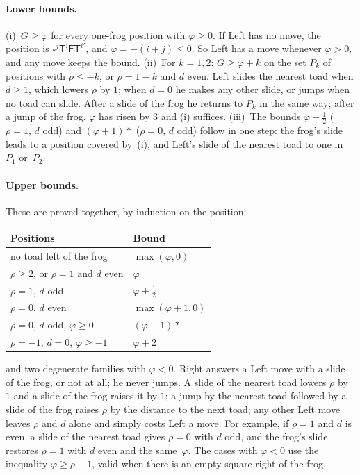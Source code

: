 \documentclass[11pt,a4paper]{article}
\newcommand{\Tt}{\mathsf{T}}
\newcommand{\Ff}{\mathsf{F}}
\newcommand{\E}{\square}
\theoremstyle{plain}
\theoremstyle{remark}
\begin{document}
\paragraph{Lower bounds.} (i)~$G\ge\varphi$ for every one-frog position with $\varphi\ge0$. If
Left has no move, the position is $\E^j\Tt^i\Ff\Tt^{i'}$, and $\varphi=-(i+j)\le0$. So Left has a
move whenever $\varphi>0$, and any move keeps the bound. (ii)~For $k=1,2$: $G\ge\varphi+k$ on the
set $P_k$ of positions with $\rho\le-k$, or $\rho=1-k$ and $d$ even. Left slides the nearest toad
when $d\ge1$, which lowers $\rho$ by $1$; when $d=0$ he makes any other slide, or jumps when no
toad can slide. After a slide of the frog he returns to $P_k$ in the same way; after a jump of
the frog, $\varphi$ has risen by $3$ and (i) suffices. (iii)~The bounds $\varphi+\frac12$
($\rho=1$, $d$ odd) and $(\varphi+1)\ast$ ($\rho=0$, $d$ odd) follow in one step: the frog's slide
leads to a position covered by~(i), and Left's slide of the nearest toad to one in $P_1$ or~$P_2$.

\paragraph{Upper bounds.} These are proved together, by induction on the position:
\begin{center}
\begin{tabular}{@{}ll@{}}
\toprule
Positions & Bound \\
\midrule
no toad left of the frog & $\max(\varphi,0)$ \\
$\rho\ge2$, or $\rho=1$ and $d$ even & $\varphi$ \\
$\rho=1$, $d$ odd & $\varphi+\frac12$ \\
$\rho=0$, $d$ even & $\max(\varphi+1,0)$ \\
$\rho=0$, $d$ odd, $\varphi\ge0$ & $(\varphi+1)\ast$ \\
$\rho=-1$, $d=0$, $\varphi\ge-1$ & $\varphi+2$ \\
\bottomrule
\end{tabular}
\end{center}
and two degenerate families with $\varphi<0$. Right answers a Left move with a slide of the frog,
or not at all; he never jumps. A slide of the nearest toad lowers $\rho$ by $1$ and a slide of the
frog raises it by $1$; a jump by the nearest toad followed by a slide of the frog raises $\rho$ by
the distance to the next toad; any other Left move leaves $\rho$ and $d$ alone and simply costs
Left a move. For example, if $\rho=1$ and $d$ is even, a slide of the nearest toad gives $\rho=0$
with $d$ odd, and the frog's slide restores $\rho=1$ with $d$ even and the same~$\varphi$. The
cases with $\varphi<0$ use the inequality $\varphi\ge\rho-1$, valid when there is an empty square
right of the frog.
\end{document}
